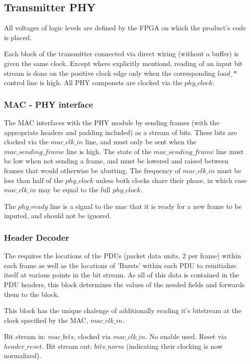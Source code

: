 \documentclass[10pt]{article}
\begin{document}
\subsection{Transmitter PHY}
All voltages of logic levels are defined by the FPGA on which the product's
code is placed.

Each block of the transmitter connected via direct wiring (without a buffer)
is given the same clock. Except where explicitly mentiond, reading of an input
bit stream is done on the positive clock edge only when the corresponding
$load\_*$ control line is high. All PHY componets are clocked via the
$phy\_clock$.

	\subsubsection{MAC - PHY interface}
	The MAC interfaces with the PHY module by sending frames (with the
	appropriate headers and padding included) as a stream of bits. These
	bits are clocked via the $mac\_clk\_in$ line, and must only be sent
	when the $mac\_sending\_frame$ line is high. The state of the
	$mac\_sending\_frame$ line must be low when not sending a frame, and
	must be lowered and raised between frames that would otherwise be
	abutting. The frequency of $mac\_clk\_in$ must be less than
	half of the $phy\_clock$ unless both clocks share their phase, in
	which case $mac\_clk\_in$ may be equal to the full $phy\_clock$.

	The $phy\_ready$ line is a signal to the mac that it is ready for a
	new frame to be inputed, and should not be ignored.

	\subsubsection{Header Decoder}
	The \cite{Randomizer} requires the locations of the PDUs (packet data
	units, 2 per frame) within each frame as well as the locations of
	'Bursts' within each PDU to reinitialize itself at various points in
	the bit stream. As all of this data is contained in the PDU headers,
	this block determines the values of the needed fields and forwards
	them to the \cite{Control Logic} block.

	This block has the unique chalenge of additionally reading it's
	bitstream at the clock specified by the MAC, $mac\_clk\_in$.

	Bit stream in: $mac\_bits$, clocked via $mac\_clk\_in$.
	No enable used. Reset via $header\_reset$. Bit stream out:
	$bits\_norm$ (indicating their clocking is now normalized).
\end{document}
